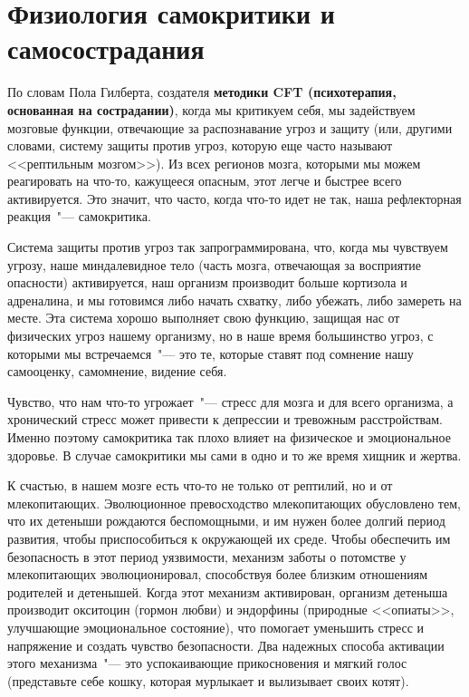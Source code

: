 
\chapter{Физиология самокритики и самосострадания} \label{The_Physiology_of_Self-Criticism_and_Self-Compassion}

По словам Пола Гилберта, создателя \textbf{методики CFT (психотерапия, основанная на сострадании)}, когда мы критикуем себя, мы задействуем мозговые функции, отвечающие за распознавание угроз и защиту (или, другими словами, систему защиты против угроз, которую еще часто называют <<рептильным мозгом>>)\cite{50}. Из всех регионов мозга, которыми мы можем реагировать на что-то, кажущееся опасным, этот легче и быстрее всего активируется. Это значит, что часто, когда что-то идет не так, наша рефлекторная реакция~"--- самокритика. 

Система защиты против угроз так запрограммирована, что, когда мы чувствуем угрозу, наше миндалевидное тело (часть мозга, отвечающая за восприятие опасности) активируется, наш организм производит больше кортизола и адреналина, и мы готовимся либо начать схватку, либо убежать, либо замереть на месте\cite{51}. Эта система хорошо выполняет свою функцию, защищая нас от физических угроз нашему организму, но в наше время большинство угроз, с которыми мы встречаемся~"--- это те, которые ставят под сомнение нашу самооценку, самомнение, видение себя. 

Чувство, что нам что-то угрожает~"--- стресс для мозга и для всего организма, а хронический стресс может привести к депрессии и тревожным расстройствам. Именно поэтому самокритика так плохо влияет на физическое и эмоциональное здоровье. В случае самокритики мы сами в одно и то же время хищник и жертва. 

К счастью, в нашем мозге есть что-то не только от рептилий, но и от млекопитающих. Эволюционное превосходство млекопитающих обусловлено тем, что их детеныши рождаются беспомощными, и им нужен более долгий период развития, чтобы приспособиться к окружающей их среде\cite{52}. Чтобы обеспечить им безопасность в этот период уязвимости, механизм заботы о потомстве у млекопитающих эволюционировал, способствуя более близким отношениям родителей и детенышей. Когда этот механизм активирован, организм детеныша производит окситоцин (гормон любви) и эндорфины (природные <<опиаты>>, улучшающие эмоциональное состояние), что помогает уменьшить стресс и напряжение и  создать чувство безопасности. Два надежных способа активации этого механизма~"--- это успокаивающие прикосновения и мягкий голос \cite{53}(представьте себе кошку, которая мурлыкает и вылизывает своих котят).  

